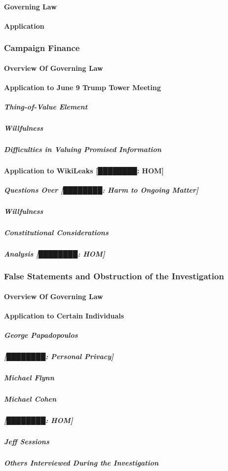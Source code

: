 \paragraph{Governing Law}

\paragraph{Application}

\subsubsection{Campaign Finance}

\paragraph{Overview Of Governing Law}

\paragraph{Application to June 9 Trump Tower Meeting}

\subparagraph{Thing-of-Value Element}

\subparagraph{Willfulness}

\subparagraph{Difficulties in Valuing Promised Information}

\paragraph{Application to WikiLeaks [████████: HOM]}

\subparagraph{Questions Over [████████: Harm to Ongoing Matter]}

\subparagraph{Willfulness}

\subparagraph{Constitutional Considerations}

\subparagraph{Analysis [████████: HOM]}

\subsubsection{False Statements and Obstruction of the Investigation}

\paragraph{Overview Of Governing Law}

\paragraph{Application to Certain Individuals}

\subparagraph{George Papadopoulos}

\subparagraph{[████████: Personal Privacy]}

\subparagraph{Michael Flynn}

\subparagraph{Michael Cohen}

\subparagraph{[████████: HOM]}

\subparagraph{Jeff Sessions}

\subparagraph{Others Interviewed During the Investigation}
